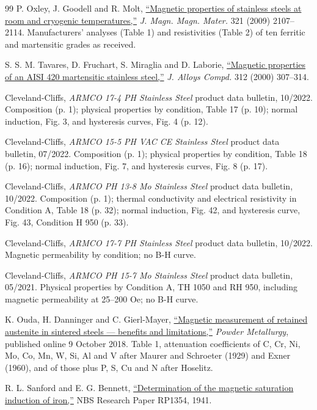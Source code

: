 \documentclass[
  11pt,
]{article}
\begin{document}
\begin{thebibliography}{99}
 P. Oxley, J. Goodell and R. Molt, \href{https://doi.org/10.1016/j.jmmm.2009.01.012}{``Magnetic properties of stainless steels at room and cryogenic temperatures,''} \emph{J. Magn. Magn. Mater.} 321 (2009) 2107--2114. Manufacturers' analyses (Table 1) and resistivities (Table 2) of ten ferritic and martensitic grades as received.

 S. S. M. Tavares, D. Fruchart, S. Miraglia and D. Laborie, \href{https://doi.org/10.1016/S0925-8388(00)01149-8}{``Magnetic properties of an AISI 420 martensitic stainless steel,''} \emph{J. Alloys Compd.} 312 (2000) 307--314.

 Cleveland-Cliffs, \emph{ARMCO 17-4 PH Stainless Steel} product data bulletin, 10/2022. Composition (p. 1); physical properties by condition, Table 17 (p. 10); normal induction, Fig. 3, and hysteresis curves, Fig. 4 (p. 12).

 Cleveland-Cliffs, \emph{ARMCO 15-5 PH VAC CE Stainless Steel} product data bulletin, 07/2022. Composition (p. 1); physical properties by condition, Table 18 (p. 16); normal induction, Fig. 7, and hysteresis curves, Fig. 8 (p. 17).

 Cleveland-Cliffs, \emph{ARMCO PH 13-8 Mo Stainless Steel} product data bulletin, 10/2022. Composition (p. 1); thermal conductivity and electrical resistivity in Condition A, Table 18 (p. 32); normal induction, Fig. 42, and hysteresis curve, Fig. 43, Condition H 950 (p. 33).

 Cleveland-Cliffs, \emph{ARMCO 17-7 PH Stainless Steel} product data bulletin, 10/2022. Magnetic permeability by condition; no B-H curve.

 Cleveland-Cliffs, \emph{ARMCO PH 15-7 Mo Stainless Steel} product data bulletin, 05/2021. Physical properties by Condition A, TH 1050 and RH 950, including magnetic permeability at 25--200 Oe; no B-H curve.

 K. Ouda, H. Danninger and C. Gierl-Mayer, \href{https://doi.org/10.1080/00325899.2018.1530850}{``Magnetic measurement of retained austenite in sintered steels --- benefits and limitations,''} \emph{Powder Metallurgy}, published online 9 October 2018. Table 1, attenuation coefficients of C, Cr, Ni, Mo, Co, Mn, W, Si, Al and V after Maurer and Schroeter (1929) and Exner (1960), and of those plus P, S, Cu and N after Hoselitz.

 R. L. Sanford and E. G. Bennett, \href{https://nvlpubs.nist.gov/nistpubs/jres/26/jresv26n1p1_a1b.pdf}{``Determination of the magnetic saturation induction of iron,''} NBS Research Paper RP1354, 1941.


\end{thebibliography}
\end{document}
